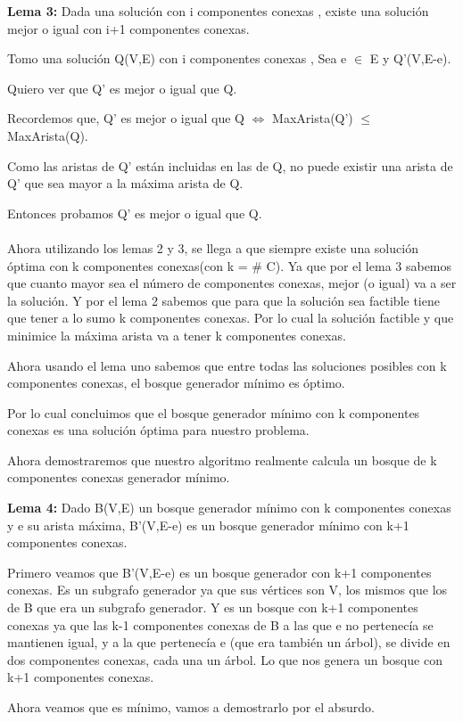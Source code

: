 \textbf{Lema 3:} Dada una solución con i componentes conexas , existe una solución mejor o igual con i+1 componentes conexas.

Tomo una solución Q(V,E) con i componentes conexas , Sea e $\in$ E y Q'(V,E-e).

Quiero ver que Q' es mejor o igual que Q.

Recordemos que, Q' es mejor o igual que Q $\Leftrightarrow$ MaxArista(Q') $\leq$ MaxArista(Q).

Como las aristas de Q' están incluidas en las de Q, no puede existir una arista de Q' que sea mayor a la máxima arista de Q.

Entonces probamos Q' es mejor o igual que Q. \\ \\

Ahora utilizando los lemas 2 y 3, se llega a que siempre existe una solución óptima con k componentes conexas(con k = \# C).
Ya que por el lema 3 sabemos que cuanto mayor sea el número de componentes conexas, mejor (o igual) va a ser la solución. Y por el lema 2 sabemos que para que la solución sea factible tiene que tener a lo sumo k componentes conexas. Por lo cual la solución factible y que minimice la máxima arista va a tener k componentes conexas. 

Ahora usando el lema uno sabemos que entre todas las soluciones posibles con k componentes conexas, el bosque generador mínimo es óptimo.

Por lo cual concluimos que el bosque generador mínimo con k componentes conexas es una solución óptima para nuestro problema.

Ahora demostraremos que nuestro algoritmo realmente calcula un bosque de k componentes conexas generador mínimo.

\textbf{Lema 4:} Dado B(V,E) un bosque generador mínimo con k componentes conexas y e su arista máxima, B'(V,E-e) es un bosque generador mínimo con k+1 componentes conexas.

Primero veamos que B'(V,E-e) es un bosque generador con k+1 componentes conexas. Es un subgrafo generador ya que sus vértices son V, los mismos que los de B que era un subgrafo generador. Y es un bosque con k+1 componentes conexas ya que las k-1 componentes conexas de B a las que e no pertenecía se mantienen igual, y a la que pertenecía e (que era también un árbol), se divide en dos componentes conexas, cada una un árbol. Lo que nos genera un bosque con k+1 componentes conexas.

Ahora veamos que es mínimo, vamos a demostrarlo por el absurdo.

